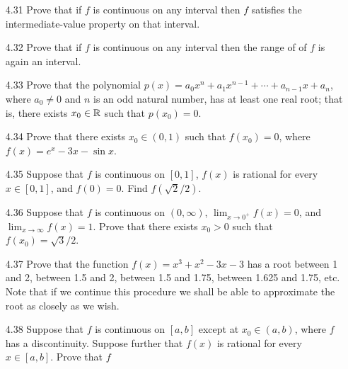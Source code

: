 \begin{enumerate}
   \item[4.31] Prove that if $f$ is continuous on any interval then $f$
               satisfies the intermediate-value property on that interval.
   \item[4.32] Prove that if $f$ is continuous on any interval then the range of
               of $f$ is again an interval.
   \item[4.33] Prove that the polynomial
               $p(x) = a_0x^n + a_1x^{n-1} + \cdots + a_{n-1}x + a_n$, where
               $a_0 \neq 0$ and $n$ is an odd natural number, has at least one
               real root; that is, there exists $x_0 \in \mathbb{R}$ such that
               $p(x_0) = 0$.
   \item[4.34] Prove that there exists $x_0 \in (0, 1)$ such that $f(x_0) = 0$,
               where $f(x) = e^x - 3x - \sin x$.
   \item[4.35] Suppose that $f$ is continuous on $[0, 1]$, $f(x)$ is rational
               for every $x \in [0, 1]$, and $f(0) = 0$. Find $f(\sqrt{2}/2)$.
   \item[4.36] Suppose that $f$ is continuous on $(0, \infty)$,
               $\lim_{x\rightarrow 0^+} f(x) = 0$, and
               $\lim_{x\rightarrow\infty} f(x) = 1$. Prove that there exists
               $x_0 > 0$ such that $f(x_0) = \sqrt{3}/2$.
   \item[4.37] Prove that the function $f(x) = x^3 + x^2 - 3x - 3$ has a root
               between 1 and 2, between 1.5 and 2, between 1.5 and 1.75, between
               1.625 and 1.75, etc. Note that if we continue this procedure we
               shall be able to approximate the root as closely as we wish.
   \item[4.38] Suppose that $f$ is continuous on $[a, b]$ except at
               $x_0 \in (a, b)$, where $f$ has a discontinuity. Suppose further
               that $f(x)$ is rational for every $x \in [a, b]$. Prove that $f$

\end{enumerate}
